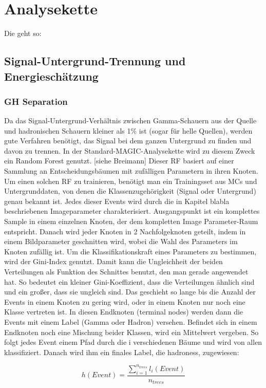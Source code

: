 \chapter{Analysekette}
Die geht so:


\section{Signal-Untergrund-Trennung und Energieschätzung}
\subsection{GH Separation}
Da das Signal-Untergrund-Verhältnis zwischen Gamma-Schauern aus der Quelle und hadronischen Schauern kleiner als 1\% ist (sogar für helle Quellen), werden gute Verfahren benötigt, das Signal bei dem ganzen Untergrund zu finden und davon zu trennen.
In der Standard-MAGIC-Analysekette wird zu diesem Zweck ein Random Forest genutzt. [siehe Breimann]
Dieser RF basiert auf einer Sammlung an Entscheidungsbäumen mit zufälligen Parametern in ihren Knoten.
Um einen solchen RF zu trainieren, benötigt man ein Trainingsset aus MCs und Untergrunddaten, von denen die Klassenzugehörigkeit (Signal oder Untergrund) genau bekannt ist.
Jedes dieser Events wird durch die in Kapitel blabla beschriebenen Imageparameter charakterisiert.
Ausgangspunkt ist ein komplettes Sample in einem einzelnen Knoten, der dem kompletten Image Parameter-Raum entspricht.
Danach wird jeder Knoten in 2 Nachfolgeknoten geteilt, indem in einem Bildparameter geschnitten wird, wobei die Wahl des Parameters im Knoten zufällig ist.
Um die Klassifikationskraft eines Parameters zu bestimmen, wird der Gini-Index genutzt.
Damit kann die Ungleichheit der beiden Verteilungen als Funktion des Schnittes benutzt, den man gerade angewendet hat.
So bedeutet ein kleiner Gini-Koeffizient, dass die Verteilungen ähnlich sind und ein großer, dass sie ungleich sind. 
Das geschieht so lange bis die Anzahl der Events in einem Knoten zu gering wird, oder in einem Knoten nur noch eine Klasse vertreten ist.
In diesen Endknoten (terminal nodes) werden dann die Events mit einem Label (Gamma oder Hadron) versehen. 
Befindet sich in einem Endknoten noch eine Mischung beider Klassen, wird ein Mittelwert vergeben.
So folgt jedes Event einem Pfad durch die i verschiedenen Bäume und wird von allen klassifiziert.
Danach wird ihm ein finales Label, die hadroness, zugewiesen:

\begin{equation}
 h(Event)=\frac{ \sum_{i=1} ^{n_{trees}} l_i(Event)}{n_{trees}}
\end{equation}

